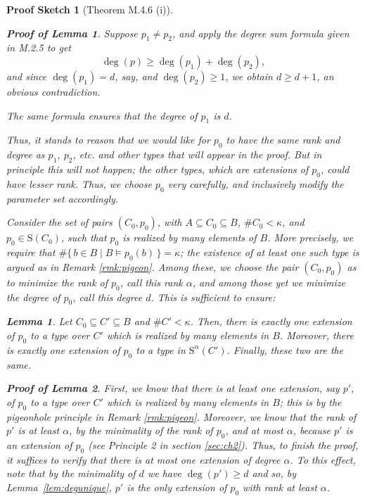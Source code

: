 \documentclass{article}
\newtheorem{lemma}[theorem]{Lemma}
\theoremstyle{nonumberplain}
\newtheorem{lemmaproof}{Proof of Lemma}
\newtheorem{sketch}{Proof Sketch}
\newcommand{\Stone}{\mathrm{S}}
\DeclareMathOperator{\degree}{deg}
\newcommand{\card}[1]{\#{#1}}
\begin{document}
\begin{sketch}[Theorem M.4.6 (i)]
\begin{lemmaproof}
Suppose $p_1 \neq p_2$, and apply the degree sum formula given in M.2.5 to get
\begin{equation}
\degree(p) \geq \degree(p_1) + \degree(p_2),
\end{equation}
and since $\degree(p_1) = d$, say, and $\degree(p_2) \geq 1$, we obtain $d \geq d + 1$, an obvious contradiction.

The same formula ensures that the degree of $p_1$ is $d$.
\end{lemmaproof}

Thus, it stands to reason that we would like for $p_0$ to have the same rank and degree as $p_1$, $p_2$, etc. and other types that will appear in the proof. But in principle this will not happen; the other types, which are extensions of $p_0$, could have lesser rank. Thus, we choose $p_0$ very carefully, and inclusively modify the parameter set accordingly.

Consider the set of pairs $(C_0, p_0)$, with $A \subseteq C_0 \subseteq B$, $\card{C_0} < \kappa$, and $p_0 \in \Stone(C_0)$, such that $p_0$ is realized by many elements of $B$. More precisely, we require that $\card{\{\,b\in B \mid B \vDash p_0(b)\,\}} = \kappa$; the existence of at least one such type is argued as in Remark \ref{rmk:pigeon}. Among these, we choose the pair $(C_0, p_0)$ as to minimize the rank of $p_0$, call this rank $\alpha$, and among those yet we minimize the degree of $p_0$, call this degree $d$. This is sufficient to ensure:

\begin{lemma}\label{lem:p0uniqueext}
Let $C_0 \subseteq C' \subseteq B$ and $\card{C'} < \kappa$. Then, there is exactly one extension of $p_0$ to a type over $C'$ which is realized by many elements in $B$. Moreover, there is exactly one extension of $p_0$ to a type in $\Stone^\alpha(C')$. Finally, these two are the same.
\end{lemma}

\begin{lemmaproof}
First, we know that there is at least one extension, say $p'$, of $p_0$ to a type over $C'$ which is realized by many elements in $B$; this is by the pigeonhole principle in Remark \ref{rmk:pigeon}. Moreover, we know that the rank of $p'$ is at least $\alpha$, by the minimality of the rank of $p_0$, and at most $\alpha$, because $p'$ is an extension of $p_0$ (see Principle 2 in section \ref{sec:ch2}). Thus, to finish the proof, it suffices to verify that there is at most one extension of degree $\alpha$. To this effect, note that by the minimality of $d$ we have $\degree(p') \geq d$ and so, by Lemma~\ref{lem:degunique}, $p'$ is the only extension of $p_0$ with rank at least $\alpha$.
\end{lemmaproof}


\end{sketch}
\end{document}
